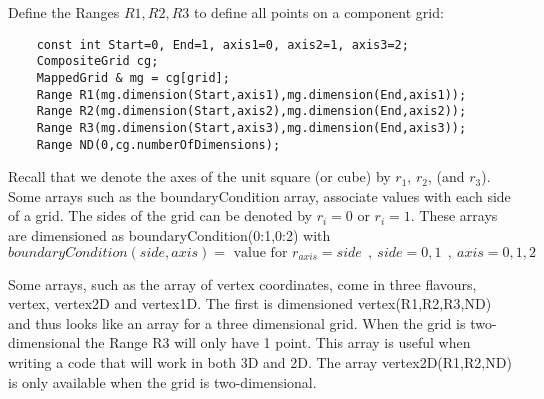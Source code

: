 Define the Ranges $R1,R2,R3$ to define all points on a component
grid:
{\footnotesize
\begin{verbatim}
    const int Start=0, End=1, axis1=0, axis2=1, axis3=2;
    CompositeGrid cg;
    MappedGrid & mg = cg[grid];
    Range R1(mg.dimension(Start,axis1),mg.dimension(End,axis1));
    Range R2(mg.dimension(Start,axis2),mg.dimension(End,axis2));
    Range R3(mg.dimension(Start,axis3),mg.dimension(End,axis3));
    Range ND(0,cg.numberOfDimensions);
\end{verbatim}
}

Recall that we denote the axes of the unit square (or cube)
by $r_1$, $r_2$, (and $r_3$).
Some arrays such as the {\ff boundaryCondition} array, associate values with each
side of a grid. The sides of the grid can be denoted by $r_i=0$ or $r_i=1$.
These arrays are dimensioned as {\ff boundaryCondition(0:1,0:2)}
with
\begin{equation}
boundaryCondition(side,axis) = \mbox{ value for } r_{axis} = side ~~,~side=0,1~~,~axis=0,1,2
\end{equation}

Some arrays, such as the array of vertex coordinates, 
come in three flavours, {\ff vertex}, {\ff vertex2D} and {\ff vertex1D}.
The first is dimensioned {\ff vertex(R1,R2,R3,ND)} and thus looks like
an array for a three dimensional grid. When the grid is two-dimensional
the Range {\ff R3} will only have 1 point. This array is useful when 
writing a code that will work in both 3D and 2D. The array
{\ff vertex2D(R1,R2,ND)} is only available when the grid is two-dimensional.

